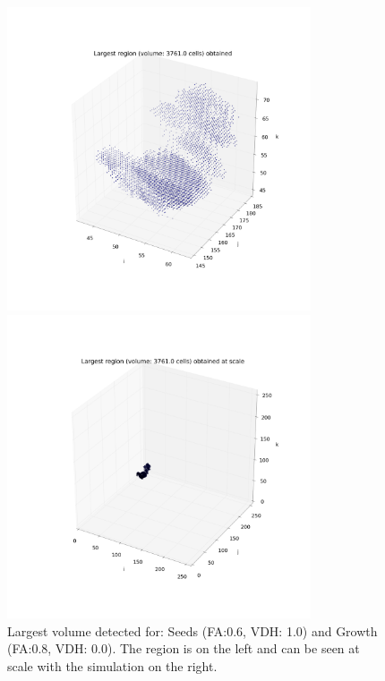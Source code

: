 \documentclass[12pt]{article}
\begin{document}
\begin{figure}[ht]
\centering
\begin{minipage}{.5\textwidth}
  \centering
  \includegraphics[width=0.8\textwidth]{groups/firstimplementation/largest_vol_24_seeds_129.png} %
\end{minipage}%
\begin{minipage}{.5\textwidth}
  \centering
  \includegraphics[width=0.8\textwidth]{groups/firstimplementation/largest_vol_24_seeds_129_scale.png}
  \end{minipage}
\caption{Largest volume detected for: Seeds (FA:0.6, VDH: 1.0) and Growth (FA:0.8, VDH: 0.0). The region is on the left and can be seen at scale with the simulation on the right.}
\label{fg:first_3D_largest}
\end{figure}
\FloatBarrier
\end{document}

